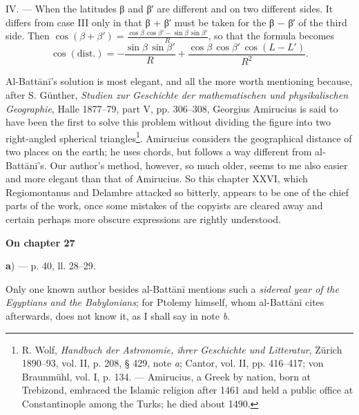 \documentclass[11pt]{article}
\newcommand{\Pg}[1]{\marginpar{\footnotesize\color{gray}#1}}
\newcommand{\UnitHead}[2]{\par\setcounter{footnoteT}{0}\needspace{8\baselineskip}\bigskip\pdfbookmark[1]{#1}{unit-#2}\hypertarget{EN-#2}{}%
 {\large\bfseries\interlinepenalty=10000 #1\par}\nobreak\medskip}
\begin{document}
\par IV. — When the latitudes {\greekfont β} and {\greekfont β}′ are different and on two different sides. It differs from case III only in that {\greekfont β} + {\greekfont β}′ must be taken for the {\greekfont β} − {\greekfont β}′ of the third side. Then $\cos(\beta + \beta') = \frac{\cos\beta\,\cos\beta' - \sin\beta\,\sin\beta'}{R}$, so that the formula becomes \[ \cos(\text{dist.}) = -\frac{\sin\beta\,\sin\beta'}{R} + \frac{\cos\beta\,\cos\beta'\,\cos(L - L')}{R^2}. \]\par
\par \Pg{I 204}Al-Battānī's solution is most elegant, and all the more worth mentioning because, after S. Günther, \emph{Studien zur Geschichte der mathematischen und physikalischen Geographie}, Halle 1877–79, part V, pp. 306–308, Georgius Amirucius is said to have been the first to solve this problem without dividing the figure into two right-angled spherical triangles\footnote{R. Wolf, \emph{Handbuch der Astronomie, ihrer Geschichte und Litteratur}, Zürich 1890–93, vol. II, p. 208, § 429, note \emph{a}; Cantor, vol. II, pp. 416–417; von Braunmühl, vol. I, p. 134. — Amirucius, a Greek by nation, born at Trebizond, embraced the Islamic religion after 1461 and held a public office at Constantinople among the Turks; he died about 1490.}. Amirucius considers the geographical distance of two places on the earth; he uses chords, but follows a way different from al-Battānī's. Our author's method, however, so much older, seems to me also easier and more elegant than that of Amirucius. So this chapter XXVI, which Regiomontanus and Delambre attacked so bitterly, appears to be one of the chief parts of the work, once some mistakes of the copyists are cleared away and certain perhaps more obscure expressions are rightly understood.\par
\UnitHead{On chapter 27}{A27}
\par\begin{center}\textbf{a}) — p. 40, ll. 28–29.\end{center}
\par Only one known author besides al-Battānī mentions such a \emph{sidereal year of the Egyptians and the Babylonians}; for Ptolemy himself, whom al-Battānī cites afterwards, does not know it, as I shall say in note \emph{b}.\par
\end{document}
